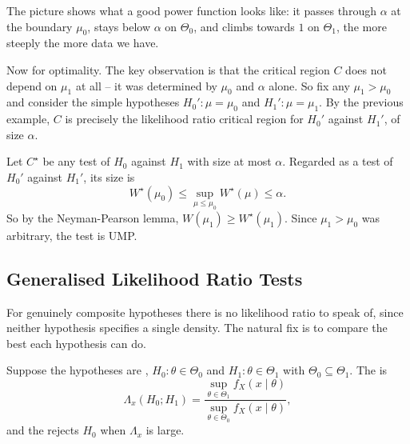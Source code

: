 \documentclass[a4paper]{scrartcl}
\begin{document}
\begin{example}
\begin{center}
  \end{center}

  The picture shows what a good power function looks like: it passes through $\alpha$ at the boundary $\mu_0$, stays below $\alpha$ on $\Theta_0$, and climbs towards $1$ on $\Theta_1$, the more steeply the more data we have.

  Now for optimality. The key observation is that the critical region $C$ does not depend on $\mu_1$ at all -- it was determined by $\mu_0$ and $\alpha$ alone. So fix any $\mu_1 > \mu_0$ and consider the simple hypotheses $H_0' : \mu = \mu_0$ and $H_1' : \mu = \mu_1$. By the previous example, $C$ is precisely the likelihood ratio critical region for $H_0'$ against $H_1'$, of size $\alpha$.

  Let $C^\star$ be any test of $H_0$ against $H_1$ with size at most $\alpha$. Regarded as a test of $H_0'$ against $H_1'$, its size is
  $$
  W^\star(\mu_0) \leq \sup_{\mu \leq \mu_0}W^\star(\mu) \leq \alpha.
  $$
  So by the Neyman-Pearson lemma, $W(\mu_1) \geq W^\star(\mu_1)$. Since $\mu_1 > \mu_0$ was arbitrary, the test is UMP.
\end{example}

\subsection{Generalised Likelihood Ratio Tests}

For genuinely composite hypotheses there is no likelihood ratio to speak of, since neither hypothesis specifies a single density. The natural fix is to compare the best each hypothesis can do.

\begin{definition}
  Suppose the hypotheses are , $H_0 : \theta \in \Theta_0$ and $H_1 : \theta \in \Theta_1$ with $\Theta_0 \subseteq \Theta_1$. The  is
  $$
  \Lambda_x(H_0;H_1) = \frac{\sup_{\theta\in\Theta_1}f_X(x\mid\theta)}{\sup_{\theta\in\Theta_0}f_X(x\mid\theta)},
  $$
  and the  rejects $H_0$ when $\Lambda_x$ is large.
\end{definition}
\end{document}
